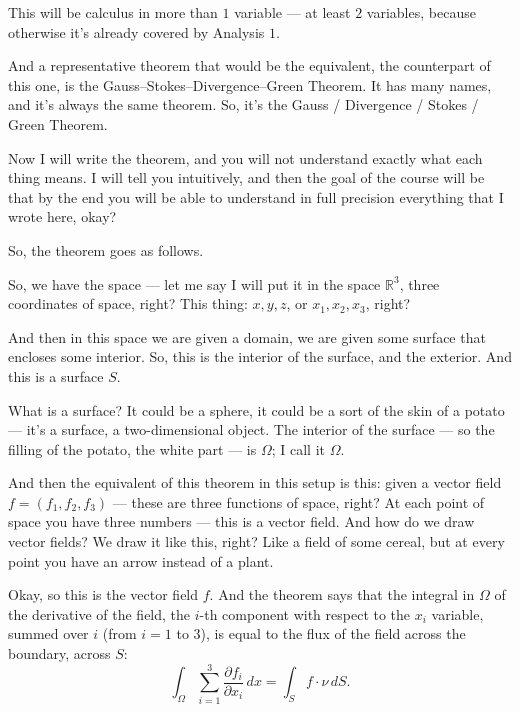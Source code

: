 \begin{spoken-clean}[00:11:45 - 00:13:30]
This will be calculus in more than $1$ variable --- at least $2$ variables, because otherwise it's already covered by Analysis $1$.

And a representative theorem that would be the equivalent, the counterpart of this one, is the Gauss--Stokes--Divergence--Green Theorem. It has many names, and it's always the same theorem. So, it's the Gauss / Divergence / Stokes / Green Theorem.

Now I will write the theorem, and you will not understand exactly what each thing means. I will tell you intuitively, and then the goal of the course will be that by the end you will be able to understand in full precision everything that I wrote here, okay?

So, the theorem goes as follows.
\end{spoken-clean}

\begin{spoken-clean}[00:13:30 - 00:16:15]
So, we have the space --- let me say I will put it in the space $\mathbb{R}^3$, three coordinates of space, right? This thing: $x, y, z$, or $x_1, x_2, x_3$, right?

And then in this space we are given a domain, we are given some surface that encloses some interior. So, this is the interior of the surface, and the exterior. And this is a surface $S$.

What is a surface? It could be a sphere, it could be a sort of the skin of a potato --- it's a surface, a two-dimensional object. The interior of the surface --- so the filling of the potato, the white part --- is $\Omega$; I call it $\Omega$.

And then the equivalent of this theorem in this setup is this: given a vector field $f = (f_1, f_2, f_3)$ --- these are three functions of space, right? At each point of space you have three numbers --- this is a vector field. And how do we draw vector fields? We draw it like this, right? Like a field of some cereal, but at every point you have an arrow instead of a plant.

Okay, so this is the vector field $f$. And the theorem says that the integral in $\Omega$ of the derivative of the field, the $i$-th component with respect to the $x_i$ variable, summed over $i$ (from $i=1$ to $3$), is equal to the flux of the field across the boundary, across $S$:
\[
\int_\Omega \sum_{i=1}^3 \frac{\partial f_i}{\partial x_i} \, dx = \int_S f \cdot \nu \, dS.
\]
\end{spoken-clean}

